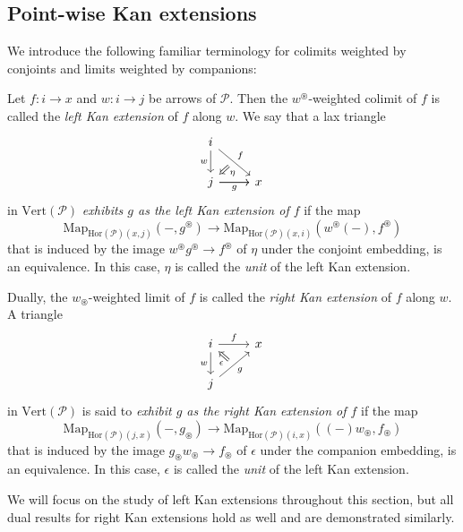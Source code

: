 \documentclass[a4paper, 11pt]{amsart}
\numberwithin{theorem}{section}
\theoremstyle{definition}
\newcommand{\map}{\mathrm{Map}}
\renewcommand{\P}{\mathscr{P}}
\renewcommand{\Vert}{\mathrm{Vert}}
\newcommand{\Hor}{\mathrm{Hor}}
\begin{document}
\subsection{Point-wise Kan extensions}\label{ssection.pke}
We introduce the following familiar terminology for colimits weighted by conjoints and limits weighted by companions:

\begin{definition}\label{def.kan-extensions}
	Let $f : i \rightarrow x$ and $w : i \rightarrow j$ be arrows of $\P$. 
	Then the $w^\circledast$-weighted colimit of $f$ is called the \textit{left Kan extension} 
	of $f$ along $w$. We say that a lax triangle
	\[
		\begin{tikzcd}
			i \arrow[dr,"f"name=f] \arrow[d, "w"'] \\
			|[alias=t]|j \arrow[r, "g"'] \arrow[r] & x
			\arrow[from=f,to=t, Rightarrow, shorten <= 6pt, "\eta"]
		\end{tikzcd}
	\]
	in $\Vert(\P)$ \textit{exhibits $g$ as the left Kan extension of $f$} 
	if the map 
	$$
	\map_{\Hor(\P)(x,j)}(-, g^\circledast) \to \map_{\Hor(\P)(x,i)}(w^\circledast(-), f^\circledast)
	$$
	that is induced by the image $w^\circledast g^\circledast \to f^\circledast$ of $\eta$ under the conjoint embedding, is an equivalence. In this case, 
	$\eta$ is called the \textit{unit} of the left Kan extension.
		
 Dually, the $w_\circledast$-weighted limit of $f$ is called the \textit{right Kan extension} of $f$ along $w$. A triangle
 \[
	\begin{tikzcd}
		|[alias=t]|i \arrow[r,"f"] \arrow[d, "w"'] & x \\
		j \arrow[ur, "g"'name=f]
		\arrow[from=f,to=t, Rightarrow, shorten <= 6pt, "\epsilon"]
	\end{tikzcd}
 \]
 in $\Vert(\P)$ is said to \textit{exhibit $g$ as the right Kan extension of $f$} 
 if the map 
 $$
 \map_{\Hor(\P)(j,x)}(-, g_\circledast) \to \map_{\Hor(\P)(i,x)}((-)w_\circledast, f_\circledast)
 $$
 that is induced by the image $g_\circledast w_\circledast \to f_\circledast$ of $\epsilon$ under the companion embedding, is an equivalence. In this case, 
 $\epsilon$ is called the \textit{unit} of the left Kan extension.
\end{definition}

We will focus on the study of left Kan extensions throughout this section, but all dual results for 
right Kan extensions hold as well and are demonstrated similarly.
\end{document}
